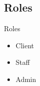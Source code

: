 \subsection{Roles}
\begin{frame}{Roles}

\begin{itemize}
\item Client
\item Staff
\item Admin
\end{itemize}

\end{frame}